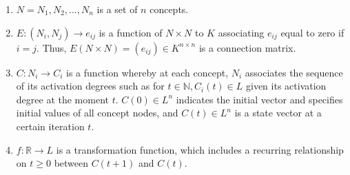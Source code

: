 \documentclass[conference]{IEEEtran}
\begin{document}
\begin{enumerate}
\item \begin{math} N = {N_{1},N_{2},...,N_{n}} \end{math} is a set of $n$ concepts.
\item \begin{math} E: (N_{i},N_{j}) \rightarrow e_{ij} \end{math} is a function of \begin{math} N \times N \end{math} to \begin{math} K \end{math} associating \begin{math} e_{ij} \end{math} equal to zero if \begin{math} i = j \end{math}. Thus, \begin{math} E(N \times N) = (e_{ij}) \in K^{n \times n} \end{math} is a connection matrix.
\item \begin{math} C: N_{i} \rightarrow C_{i} \end{math} is a function whereby at each concept, \begin{math} N_{i} \end{math} associates the sequence of its activation degrees such as for \begin{math} t \in \mathbb{N}, C_{i}(t) \in L \end{math} given its activation degree at the moment \begin{math} t \end{math}. \begin{math} C(0) \in L^{n} \end{math} indicates the initial vector and specifies initial values of all concept nodes, and \begin{math} C(t) \in L^{n} \end{math} is a state vector at a certain iteration \begin{math} t \end{math}.
\item \begin{math} f: \mathbb{R} \rightarrow L \end{math} is a transformation function, which includes a recurring relationship on \begin{math} t \geqslant 0 \end{math} between \begin{math} C(t+1) \end{math} and \begin{math} C(t) \end{math}.
\end{enumerate}
\end{document}
